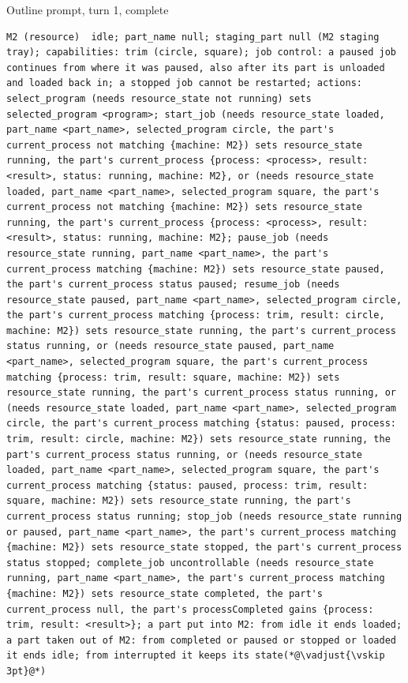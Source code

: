 \documentclass[preprint,12pt,authoryear]{elsarticle}
\begin{document}
\begin{fullbox}{Outline prompt, turn 1, complete}
\begin{lstlisting}[showlines=true]
M2 (resource)  idle; part_name null; staging_part null (M2 staging tray); capabilities: trim (circle, square); job control: a paused job continues from where it was paused, also after its part is unloaded and loaded back in; a stopped job cannot be restarted; actions: select_program (needs resource_state not running) sets selected_program <program>; start_job (needs resource_state loaded, part_name <part_name>, selected_program circle, the part's current_process not matching {machine: M2}) sets resource_state running, the part's current_process {process: <process>, result: <result>, status: running, machine: M2}, or (needs resource_state loaded, part_name <part_name>, selected_program square, the part's current_process not matching {machine: M2}) sets resource_state running, the part's current_process {process: <process>, result: <result>, status: running, machine: M2}; pause_job (needs resource_state running, part_name <part_name>, the part's current_process matching {machine: M2}) sets resource_state paused, the part's current_process status paused; resume_job (needs resource_state paused, part_name <part_name>, selected_program circle, the part's current_process matching {process: trim, result: circle, machine: M2}) sets resource_state running, the part's current_process status running, or (needs resource_state paused, part_name <part_name>, selected_program square, the part's current_process matching {process: trim, result: square, machine: M2}) sets resource_state running, the part's current_process status running, or (needs resource_state loaded, part_name <part_name>, selected_program circle, the part's current_process matching {status: paused, process: trim, result: circle, machine: M2}) sets resource_state running, the part's current_process status running, or (needs resource_state loaded, part_name <part_name>, selected_program square, the part's current_process matching {status: paused, process: trim, result: square, machine: M2}) sets resource_state running, the part's current_process status running; stop_job (needs resource_state running or paused, part_name <part_name>, the part's current_process matching {machine: M2}) sets resource_state stopped, the part's current_process status stopped; complete_job uncontrollable (needs resource_state running, part_name <part_name>, the part's current_process matching {machine: M2}) sets resource_state completed, the part's current_process null, the part's processCompleted gains {process: trim, result: <result>}; a part put into M2: from idle it ends loaded; a part taken out of M2: from completed or paused or stopped or loaded it ends idle; from interrupted it keeps its state(*@\vadjust{\vskip 3pt}@*)

\end{lstlisting}
\end{fullbox}
\end{document}
